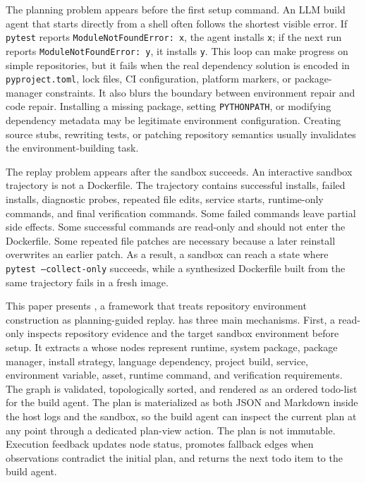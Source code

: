 The planning problem appears before the first setup command.
An LLM build agent that starts directly from a shell often follows the shortest visible error.
If \texttt{pytest} reports \texttt{ModuleNotFoundError: x}, the agent installs \texttt{x}; if the next run reports \texttt{ModuleNotFoundError: y}, it installs \texttt{y}.
This loop can make progress on simple repositories, but it fails when the real dependency solution is encoded in \texttt{pyproject.toml}, lock files, CI configuration, platform markers, or package-manager constraints.
It also blurs the boundary between environment repair and code repair.
Installing a missing package, setting \texttt{PYTHONPATH}, or modifying dependency metadata may be legitimate environment configuration.
Creating source stubs, rewriting tests, or patching repository semantics usually invalidates the environment-building task.

The replay problem appears after the sandbox succeeds.
An interactive sandbox trajectory is not a Dockerfile.
The trajectory contains successful installs, failed installs, diagnostic probes, repeated file edits, service starts, runtime-only commands, and final verification commands.
Some failed commands leave partial side effects.
Some successful commands are read-only and should not enter the Dockerfile.
Some repeated file patches are necessary because a later reinstall overwrites an earlier patch.
As a result, a sandbox can reach a state where \texttt{pytest --collect-only} succeeds, while a synthesized Dockerfile built from the same trajectory fails in a fresh image.

This paper presents \tool, a framework that treats repository environment construction as planning-guided replay.
\tool has three main mechanisms.
First, a read-only \planner inspects repository evidence and the target sandbox environment before setup.
It extracts a \ttg whose nodes represent runtime, system package, package manager, install strategy, language dependency, project build, service, environment variable, asset, runtime command, and verification requirements.
The graph is validated, topologically sorted, and rendered as an ordered todo-list for the build agent.
The plan is materialized as both JSON and Markdown inside the host logs and the sandbox, so the build agent can inspect the current plan at any point through a dedicated plan-view action.
The plan is not immutable.
Execution feedback updates node status, promotes fallback edges when observations contradict the initial plan, and returns the next todo item to the build agent.

